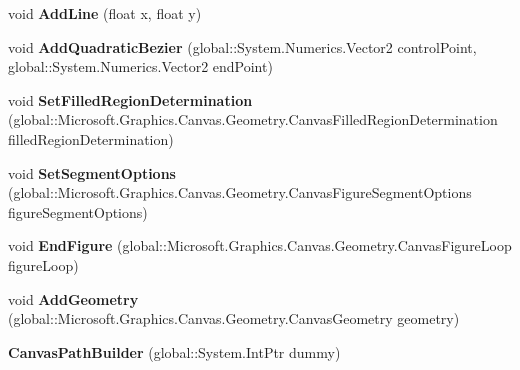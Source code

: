 \begin{DoxyCompactItemize}
void {\bfseries Add\+Line} (float x, float y)
\item 
\mbox{\label{class_microsoft_1_1_graphics_1_1_canvas_1_1_geometry_1_1_canvas_path_builder_a2cf174a6a37788207d5f4464513863e4}} 
void {\bfseries Add\+Quadratic\+Bezier} (global\+::\+System.\+Numerics.\+Vector2 control\+Point, global\+::\+System.\+Numerics.\+Vector2 end\+Point)
\item 
\mbox{\label{class_microsoft_1_1_graphics_1_1_canvas_1_1_geometry_1_1_canvas_path_builder_a933ad60d19366b2851e3ad2a78ce363c}} 
void {\bfseries Set\+Filled\+Region\+Determination} (global\+::\+Microsoft.\+Graphics.\+Canvas.\+Geometry.\+Canvas\+Filled\+Region\+Determination filled\+Region\+Determination)
\item 
\mbox{\label{class_microsoft_1_1_graphics_1_1_canvas_1_1_geometry_1_1_canvas_path_builder_a39666b72c541b2b7bf5ce95ef802b83f}} 
void {\bfseries Set\+Segment\+Options} (global\+::\+Microsoft.\+Graphics.\+Canvas.\+Geometry.\+Canvas\+Figure\+Segment\+Options figure\+Segment\+Options)
\item 
\mbox{\label{class_microsoft_1_1_graphics_1_1_canvas_1_1_geometry_1_1_canvas_path_builder_ae0a5d2f680c829d0627fd7361a291e5b}} 
void {\bfseries End\+Figure} (global\+::\+Microsoft.\+Graphics.\+Canvas.\+Geometry.\+Canvas\+Figure\+Loop figure\+Loop)
\item 
\mbox{\label{class_microsoft_1_1_graphics_1_1_canvas_1_1_geometry_1_1_canvas_path_builder_acb9326bae9395128543ba0a35a264122}} 
void {\bfseries Add\+Geometry} (global\+::\+Microsoft.\+Graphics.\+Canvas.\+Geometry.\+Canvas\+Geometry geometry)
\item 
\mbox{\label{class_microsoft_1_1_graphics_1_1_canvas_1_1_geometry_1_1_canvas_path_builder_a935c167a036e0d8d48a396c57ec7fa62}} 
{\bfseries Canvas\+Path\+Builder} (global\+::\+System.\+Int\+Ptr dummy)

\end{DoxyCompactItemize}
